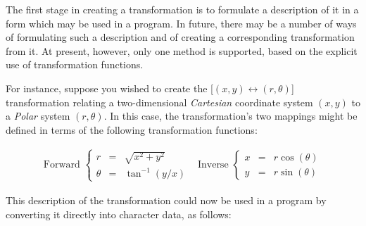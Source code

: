 The first stage in creating a transformation is to formulate a description 
of it in a form which may be used in a program.
In future, there may be a number of ways of formulating such a description 
and of creating a corresponding transformation from it.
At present, however, only one method is supported, based on the explicit use
of transformation functions.

For instance, suppose you wished to create the \mbox{[$(x,y) \leftrightarrow
(r,\theta)$]} transformation relating a two-dimensional {\em Cartesian}
coordinate system \mbox{$(x,y)$} to a {\em Polar} system
\mbox{$(r,\theta)$}. 
In this case, the transformation's two mappings might be defined in terms of
the following transformation functions: 

\begin{equation}
\begin{array}{cc}
\mbox{Forward } \left\{
\begin{array}{lll}
r & = & \sqrt{x^2+y^2} \\
\theta & = & \tan^{-1} \left( {y/x} \right)
\end{array}
\right.
&
\mbox{Inverse } \left\{
\begin{array}{lll}
x & = & r \cos( \theta ) \\
y & = & r \sin( \theta )
\end{array}
\right.
\end{array}
\label{equation:polar}
\end{equation}

This description of the transformation could now be used in a program by
converting it directly into character data, as follows: 

